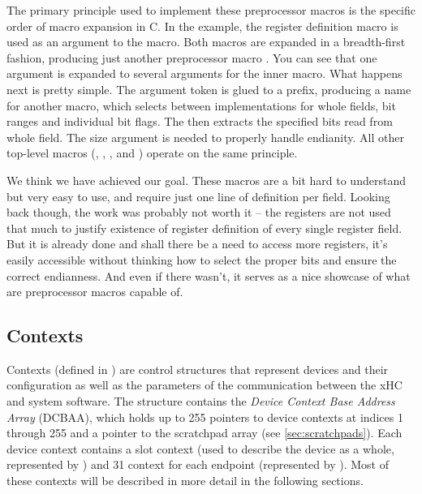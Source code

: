 The primary principle used to implement these preprocessor macros is the
specific order of macro expansion in C. In the example, the register definition
macro is used as an argument to the  macro. Both macros are
expanded in a breadth-first fashion, producing just another preprocessor macro
. You can see
that one argument is expanded to several arguments for the inner macro. What
happens next is pretty simple. The  argument token is glued to
a prefix, producing a name for another macro, which selects between
implementations for whole fields, bit ranges and individual bit flags. The
 then extracts the specified bits read from whole
field. The size argument is needed to properly handle endianity. All other
top-level macros (, ,
,  and ) operate
on the same principle.

We think we have achieved our goal. These macros are a bit hard to understand but
very easy to use, and require just one line of definition per field. Looking
back though, the work was probably not worth it -- the registers are not used
that much to justify existence of register definition of every single register
field. But it is already done and shall there be a need to access more registers,
it's easily accessible without thinking how to select the proper bits and
ensure the correct endianness. And even if there wasn't, it serves as a nice
showcase of what are preprocessor macros capable of.

\subsection{Contexts}

Contexts (defined in )
are control structures that represent devices and their configuration as well
as the parameters of the communication between the xHC and system software. The
 structure contains the \textit{Device Context Base Address Array} (DCBAA), which
holds up to 255 pointers to device contexts at indices 1 through 255 and a pointer to
the scratchpad array (see \ref{sec:scratchpads}). Each device context contains a slot
context (used to describe the device as a whole, represented by ) and
31 context for each endpoint (represented by ). Most of these contexts
will be described in more detail in the following sections.

